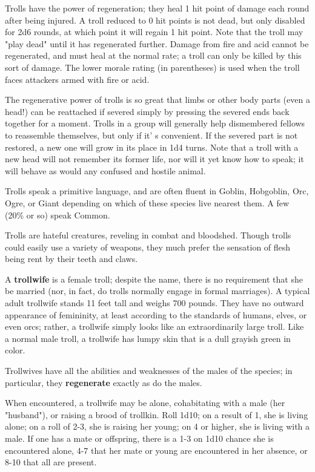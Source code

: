 \documentclass[a4paper,twoside,openany,10pt]{book}
\begin{document}
\begin{multicols}{2}
Trolls have the power of regeneration; they heal 1 hit point of damage each round after being injured. A troll reduced to 0 hit points is not dead, but only disabled for 2d6 rounds, at which point it will regain 1 hit point. Note that the troll may "play dead" until it has regenerated further. Damage from fire and acid cannot be regenerated, and must heal at the normal rate; a troll can only be killed by this sort of damage. The lower morale rating (in parentheses) is used when the troll faces attackers armed with fire or acid.

The regenerative power of trolls is so great that limbs or other body parts (even a head!) can be reattached if severed simply by pressing the severed ends back together for a moment. Trolls in a group will generally help dismembered fellows to reassemble themselves, but only if it' s convenient. If the severed part is not restored, a new one will grow in its place in 1d4 turns. Note that a troll with a new head will not remember its former life, nor will it yet know how to speak; it will behave as would any confused and hostile animal.

Trolls speak a primitive language, and are often fluent in Goblin, Hobgoblin, Orc, Ogre, or Giant depending on which of these species live nearest them. A few (20\% or so) speak Common.

Trolls are hateful creatures, reveling in combat and bloodshed. Though trolls could easily use a variety of weapons, they much prefer the sensation of flesh being rent by their teeth and claws. 

A \textbf{trollwife }is a female troll; despite the name, there is no requirement that she be married (nor, in fact, do trolls normally engage in formal marriages). A typical adult trollwife stands 11 feet tall and weighs 700 pounds. They have no outward appearance of femininity, at least according to the standards of humans, elves, or even orcs; rather, a trollwife simply looks like an extraordinarily large troll. Like a normal male troll, a trollwife has lumpy skin that is a dull grayish green in color.

Trollwives have all the abilities and weaknesses of the males of the species; in particular, they \textbf{regenerate} exactly as do the males.

When encountered, a trollwife may be alone, cohabitating with a male (her "husband"), or raising a brood of trollkin. Roll 1d10; on a result of 1, she is living alone; on a roll of 2-3, she is raising her young; on 4 or higher, she is living with a male. If one has a mate or offspring, there is a 1-3 on 1d10 chance she is encountered alone, 4-7 that her mate or young are encountered in her absence, or 8-10 that all are present.


\end{multicols}
\end{document}
